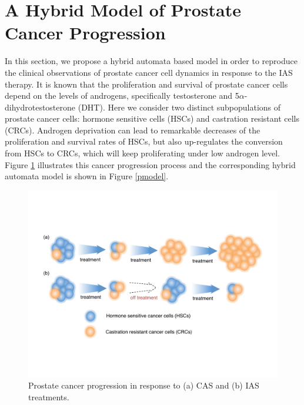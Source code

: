 \section{A Hybrid Model of Prostate Cancer Progression }\label{sec.model}

In this section, we propose a hybrid automata based model in order to reproduce the clinical observations \cite{bruchovsky06, bruchovsky07} of prostate cancer cell dynamics in response to the IAS therapy. It is known that the proliferation and survival of prostate cancer cells depend on the levels of androgens, specifically testosterone and 5$\alpha$-dihydrotestosterone (DHT).
Here we consider two distinct subpopulations of prostate cancer cells: hormone sensitive cells (HSCs) and castration resistant cells (CRCs). Androgen deprivation can lead to remarkable decreases of the proliferation and survival rates of HSCs, but also up-regulates the conversion from HSCs to CRCs, which will keep proliferating under low androgen level. Figure \ref{progression} illustrates this cancer progression process and the corresponding hybrid automata model is shown in Figure \ref{pmodel}. 

\begin{figure}[htb]
\centering
\includegraphics[scale=0.38]{fig-progression}
\caption{Prostate cancer progression in response to (a) CAS and (b) IAS treatments.}
\label{progression}
\end{figure}

